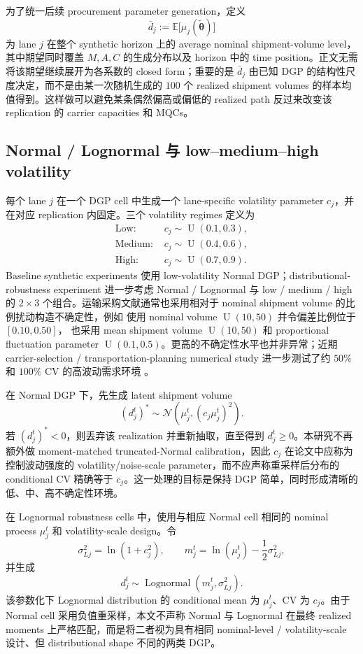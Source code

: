 \documentclass[11pt,a4paper]{ctexart}
\newcommand{\U}{\operatorname{U}}
\newcommand{\Normal}{\mathcal N}
\begin{document}
为了统一后续 procurement parameter generation，定义
\[
\bar d_j:=\mathbb E\bigl[\mu_j(\widetilde{\boldsymbol\theta})\bigr]
\]
为 lane $j$ 在整个 synthetic horizon 上的 average nominal shipment-volume level，其中期望同时覆盖 $M,A,C$ 的生成分布以及 horizon 中的 time position。正文无需将该期望继续展开为各系数的 closed form；重要的是 $\bar d_j$ 由已知 DGP 的结构性尺度决定，而不是由某一次随机生成的 $100$ 个 realized shipment volumes 的样本均值得到。这样做可以避免某条偶然偏高或偏低的 realized path 反过来改变该 replication 的 carrier capacities 和 MQCs。

\subsection{Normal / Lognormal 与 low--medium--high volatility}

每个 lane $j$ 在一个 DGP cell 中生成一个 lane-specific volatility parameter $c_j$，并在对应 replication 内固定。三个 volatility regimes 定义为
\[
\begin{aligned}
\text{Low: }&c_j\sim \U(0.1,0.3),\\
\text{Medium: }&c_j\sim \U(0.4,0.6),\\
\text{High: }&c_j\sim \U(0.7,0.9).
\end{aligned}
\]
Baseline synthetic experiments 使用 low-volatility Normal DGP；distributional-robustness experiment 进一步考虑 Normal / Lognormal 与 low / medium / high 的 $2\times3$ 个组合。运输采购文献通常也采用相对于 nominal shipment volume 的比例扰动构造不确定性，例如 \citet{remli2013} 使用 nominal volume $\U(10,50)$ 并令偏差比例位于 $[0.10,0.50]$，\citet{li2023} 也采用 mean shipment volume $\U(10,50)$ 和 proportional fluctuation parameter $\U(0.1,0.5)$。更高的不确定性水平也并非异常；近期 carrier-selection / transportation-planning numerical study 进一步测试了约 $50\%$ 和 $100\%$ CV 的高波动需求环境 \citep{schmiedel2025}。

在 Normal DGP 下，先生成 latent shipment volume
\[
(d_j^t)^*\sim \Normal\!\left(\mu_j^t,(c_j\mu_j^t)^2\right).
\]
若 $(d_j^t)^*<0$，则丢弃该 realization 并重新抽取，直至得到 $d_j^t\ge0$。本研究不再额外做 moment-matched truncated-Normal calibration，因此 $c_j$ 在论文中应称为控制波动强度的 volatility/noise-scale parameter，而不应声称重采样后分布的 conditional CV 精确等于 $c_j$。这一处理的目标是保持 DGP 简单，同时形成清晰的低、中、高不确定性环境。

在 Lognormal robustness cells 中，使用与相应 Normal cell 相同的 nominal process $\mu_j^t$ 和 volatility-scale design。令
\[
\sigma_{Lj}^2=\ln(1+c_j^2),\qquad
m_j^t=\ln(\mu_j^t)-\frac{1}{2}\sigma_{Lj}^2,
\]
并生成
\[
d_j^t\sim \operatorname{Lognormal}(m_j^t,\sigma_{Lj}^2).
\]
该参数化下 Lognormal distribution 的 conditional mean 为 $\mu_j^t$、CV 为 $c_j$。由于 Normal cell 采用负值重采样，本文不声称 Normal 与 Lognormal 在最终 realized moments 上严格匹配，而是将二者视为具有相同 nominal-level / volatility-scale 设计、但 distributional shape 不同的两类 DGP。
\end{document}
